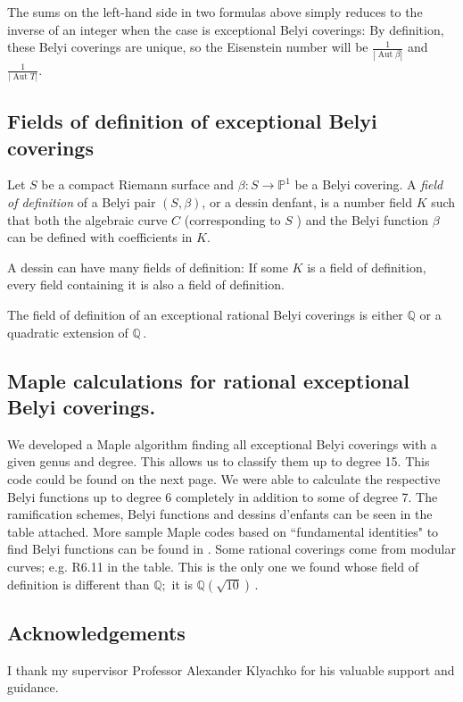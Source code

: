The sums on the left-hand side in two formulas above simply reduces to the inverse of an integer when the case is exceptional Belyi coverings: By definition, these Belyi coverings are unique, so the Eisenstein number will be $\frac{1}{|\operatorname{Aut} \beta|}$ and $\frac{1}{|\operatorname{Aut} T|}$.
\subsection{Fields of definition of exceptional Belyi coverings
}

\begin{dfn}
 Let $S$ be a compact Riemann surface and $\beta: S \rightarrow \mathbb{P}^{1}$ be a Belyi covering. A \textit{field of definition} of a Belyi pair $(S, \beta)$, or a dessin denfant, is a number field $K$ such that both the algebraic curve $C$ (corresponding to $S$ ) and the Belyi function $\beta$ can be defined with coefficients in $K$.
\end{dfn}

\begin{rem}
    A dessin can have many fields of definition: If some $K$ is a field of definition, every field containing it is also a field of definition.
\end{rem}

\begin{thm}
    The field of definition of an exceptional rational Belyi coverings is either $\mathbb{Q}$ or a quadratic extension of $\mathbb{Q}\,.$
\end{thm}

\vskip5pt

\subsection{Maple calculations for rational exceptional Belyi coverings.}
We developed a Maple algorithm finding all exceptional Belyi coverings with a given genus and degree. This allows us to classify them up to degree 15. This code could be found on the next page. We were able to calculate the respective Belyi functions up to degree 6 completely in addition to some of degree 7. The ramification schemes, Belyi functions and dessins d'enfants can be seen in the table attached. More sample Maple codes based on ``fundamental identities" to find Belyi functions can be found in \cite{Kurk}.  Some rational coverings come from modular curves; e.g. R6.11 in the table. This is the only one we found whose field of definition is different than $\mathbb{Q};$ it is $\mathbb{Q}(\sqrt{10})\,.$ 






\subsection{Acknowledgements}
I thank my supervisor Professor Alexander Klyachko for his valuable support and guidance.




